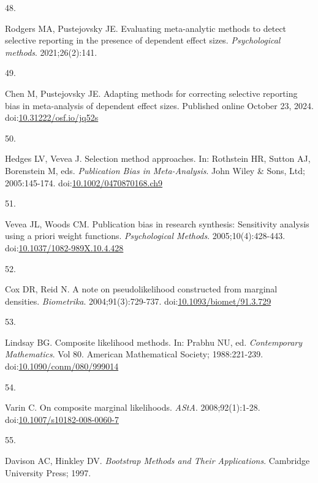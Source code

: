 \documentclass[
  man, donotrepeattitle,floatsintext]{apa7}
\newlength{\cslhangindent}
\newlength{\csllabelwidth}
\newenvironment{CSLReferences}[2] %
 {\begin{list}{}{%
  \setlength{\itemindent}{0pt}
  \setlength{\leftmargin}{0pt}
  \setlength{\parsep}{0pt}
  \ifodd #1
   \setlength{\leftmargin}{\cslhangindent}
   \setlength{\itemindent}{-1\cslhangindent}
  \fi
  \setlength{\itemsep}{#2\baselineskip}}}
 {\end{list}}
\newcommand{\CSLLeftMargin}[1]{\parbox[t]{\csllabelwidth}{\strut#1\strut}}
\newcommand{\CSLRightInline}[1]{\parbox[t]{\linewidth - \csllabelwidth}{\strut#1\strut}}
\begin{document}
\begin{CSLReferences}{0}{1}
\CSLLeftMargin{48. }%
\CSLRightInline{Rodgers MA, Pustejovsky JE. Evaluating meta-analytic methods to detect selective reporting in the presence of dependent effect sizes. \emph{Psychological methods}. 2021;26(2):141.}

\CSLLeftMargin{49. }%
\CSLRightInline{Chen M, Pustejovsky JE. Adapting methods for correcting selective reporting bias in meta-analysis of dependent effect sizes. Published online October 23, 2024. doi:\href{https://doi.org/10.31222/osf.io/jq52s}{10.31222/osf.io/jq52s}}

\CSLLeftMargin{50. }%
\CSLRightInline{Hedges LV, Vevea J. Selection method approaches. In: Rothstein HR, Sutton AJ, Borenstein M, eds. \emph{Publication Bias in Meta-Analysis}. {John Wiley \& Sons, Ltd}; 2005:145-174. doi:\href{https://doi.org/10.1002/0470870168.ch9}{10.1002/0470870168.ch9}}

\CSLLeftMargin{51. }%
\CSLRightInline{Vevea JL, Woods CM. Publication bias in research synthesis: Sensitivity analysis using a priori weight functions. \emph{Psychological Methods}. 2005;10(4):428-443. doi:\href{https://doi.org/10.1037/1082-989X.10.4.428}{10.1037/1082-989X.10.4.428}}

\CSLLeftMargin{52. }%
\CSLRightInline{Cox DR, Reid N. A note on pseudolikelihood constructed from marginal densities. \emph{Biometrika}. 2004;91(3):729-737. doi:\href{https://doi.org/10.1093/biomet/91.3.729}{10.1093/biomet/91.3.729}}

\CSLLeftMargin{53. }%
\CSLRightInline{Lindsay BG. Composite likelihood methods. In: Prabhu NU, ed. \emph{Contemporary {Mathematics}}. Vol 80. American Mathematical Society; 1988:221-239. doi:\href{https://doi.org/10.1090/conm/080/999014}{10.1090/conm/080/999014}}

\CSLLeftMargin{54. }%
\CSLRightInline{Varin C. On composite marginal likelihoods. \emph{AStA}. 2008;92(1):1-28. doi:\href{https://doi.org/10.1007/s10182-008-0060-7}{10.1007/s10182-008-0060-7}}

\CSLLeftMargin{55. }%
\CSLRightInline{Davison AC, Hinkley DV. \emph{Bootstrap Methods and Their Applications}. Cambridge University Press; 1997.}


\end{CSLReferences}
\end{document}
